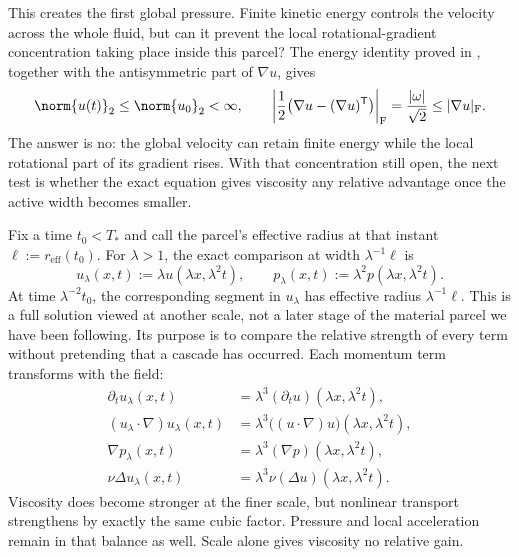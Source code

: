 This creates the first global pressure. Finite kinetic energy controls the velocity across the whole fluid, but can it prevent the local rotational-gradient concentration taking place inside this parcel? The energy identity proved in , together with the antisymmetric part of \(\nabla u\), gives
\[
  \norm{u(t)}_2
  \leq
  \norm{u_0}_2
  <\infty,
  \qquad
  \left|\frac12\bigl(\nabla u-(\nabla u)^{\mathsf T}\bigr)\right|_{\mathrm F}
  =
  \frac{|\omega|}{\sqrt2}
  \leq
  |\nabla u|_{\mathrm F}.
\]
The answer is no: the global velocity can retain finite energy while the local rotational part of its gradient rises. With that concentration still open, the next test is whether the exact equation gives viscosity any relative advantage once the active width becomes smaller.


Fix a time \(t_0<T_*\) and call the parcel's effective radius at that instant \(\ell:=r_{\mathrm{eff}}(t_0)\). For \(\lambda>1\), the exact \NavierStokes{} comparison at width \(\lambda^{-1}\ell\) is
\[
  u_\lambda(x,t)
  :=
  \lambda u(\lambda x,\lambda^2t),
  \qquad
  p_\lambda(x,t)
  :=
  \lambda^2p(\lambda x,\lambda^2t).
\]
At time \(\lambda^{-2}t_0\), the corresponding segment in \(u_\lambda\) has effective radius \(\lambda^{-1}\ell\). This is a full solution viewed at another scale, not a later stage of the material parcel we have been following. Its purpose is to compare the relative strength of every term without pretending that a cascade has occurred. Each momentum term transforms with the field:
\[
\begin{aligned}
  \partial_tu_\lambda(x,t)
  &=
  \lambda^3(\partial_tu)(\lambda x,\lambda^2t),
  \\
  (u_\lambda\cdot\nabla)u_\lambda(x,t)
  &=
  \lambda^3\bigl((u\cdot\nabla)u\bigr)(\lambda x,\lambda^2t),
  \\
  \nabla p_\lambda(x,t)
  &=
  \lambda^3(\nabla p)(\lambda x,\lambda^2t),
  \\
  \nu\Delta u_\lambda(x,t)
  &=
  \lambda^3\nu(\Delta u)(\lambda x,\lambda^2t).
\end{aligned}
\]
Viscosity does become stronger at the finer scale, but nonlinear transport strengthens by exactly the same cubic factor. Pressure and local acceleration remain in that balance as well. Scale alone gives viscosity no relative gain.



